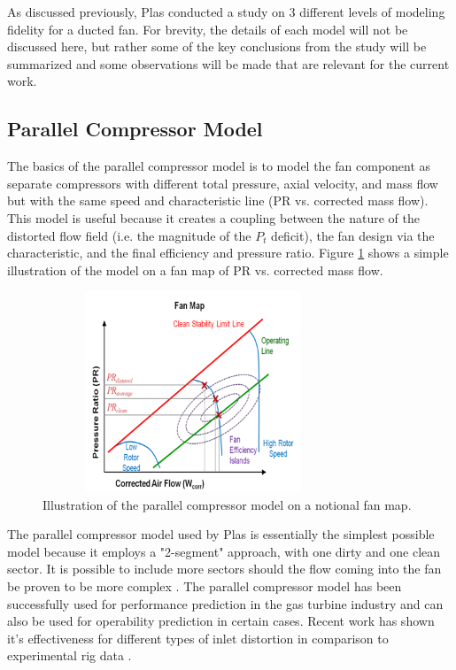 \documentclass[12pt]{gatech-thesis}
\begin{document}
As discussed previously, Plas \cite{Plas2007} conducted a study on 3 different levels of modeling fidelity for a ducted fan.  For brevity, the details of each model will not be discussed here, but rather some of the key conclusions from the study will be summarized and some observations will be made that are relevant for the current work.

\subsection{Parallel Compressor Model}
The basics of the parallel compressor model is to model the fan component as separate compressors with different total pressure, axial velocity, and mass flow but with the same speed and characteristic line (PR vs. corrected mass flow).  This model is useful because it creates a coupling between the nature of the distorted flow field (i.e. the magnitude of the $P_t$ deficit), the fan design via the characteristic, and the final efficiency and pressure ratio.  Figure \ref{PC_Figure} shows a simple illustration of the model on a fan map of PR vs. corrected mass flow.  
	\begin{figure}[htpb]
	\centering
	\includegraphics[width=90mm, height =60mm, clip=true, trim = 0mm 0mm 0mm 0mm]{PC_Figure.png}
	\caption{Illustration of the parallel compressor model on a notional fan map.}
	\label{PC_Figure}
	\end{figure}

\indent The parallel compressor model used by Plas is essentially the simplest possible model because it employs a "2-segment" approach, with one dirty and one clean sector.  It is possible to include more sectors should the flow coming into the fan be proven to be more complex \cite{Greitzer1993}.  The parallel compressor model has been successfully used for performance prediction in the gas turbine industry and can also be used for operability prediction in certain cases.  Recent work has shown it's effectiveness for different types of inlet distortion in comparison to experimental rig data \cite{Cousins2011}.
\end{document}
